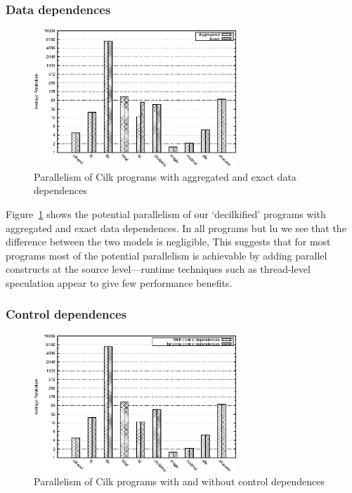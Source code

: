 \subsubsection{Data dependences}

\begin{figure}
 \centering
 \includegraphics[width=3in]{cilk-data}
 \caption{Parallelism of Cilk programs with aggregated and exact data dependences}
 \label{cilk-data}
\end{figure}

Figure~\ref{cilk-data} shows the potential parallelism of our `decilkified' programs with aggregated and exact data dependences.
In all programs but lu we see that the difference between the two models is negligible,
This suggests that for most programs most of the potential parallelism is achievable by adding parallel constructs at the source level---runtime techniques such as thread-level speculation appear to give few performance benefits.

\subsubsection{Control dependences}

\begin{figure}
 \centering
 \includegraphics[width=3in]{cilk-ctl}
 \caption{Parallelism of Cilk programs with and without control dependences}
 \label{cilk-ctl}
\end{figure}

